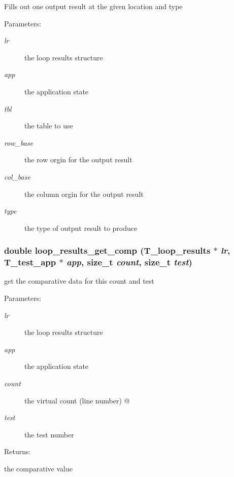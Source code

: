 Fills out one output result at the given location and type \begin{Desc}
\item[Parameters: ]\par
\begin{description}
\item[{\em 
lr}]the loop results structure \item[{\em 
app}]the application state \item[{\em 
tbl}]the table to use \item[{\em 
row\_\-base}]the row orgin for the output result \item[{\em 
col\_\-base}]the column orgin for the output result \item[{\em 
type}]the type of output result to produce \end{description}
\end{Desc}
\subsubsection{\setlength{\rightskip}{0pt plus 5cm}double loop\_\-results\_\-get\_\-comp ({\bf T\_\-loop\_\-results} $\ast$ {\em lr}, {\bf T\_\-test\_\-app} $\ast$ {\em app}, size\_\-t {\em count}, size\_\-t {\em test})}\label{group__loop__test_a9}


get the comparative data for this count and test \begin{Desc}
\item[Parameters: ]\par
\begin{description}
\item[{\em 
lr}]the loop results structure \item[{\em 
app}]the application state \item[{\em 
count}]the virtual count (line number) @ \item[{\em 
test}]the test number \end{description}
\end{Desc}
\begin{Desc}
\item[Returns: ]\par
the comparative value \end{Desc}
